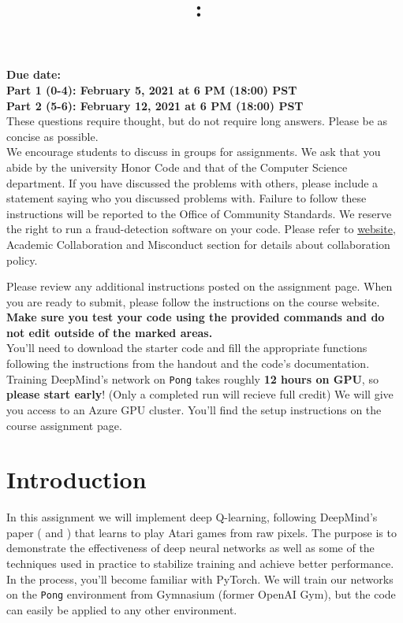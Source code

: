 \documentclass{article}
\title{
\vspace{-1in}
\textmd{\textbf{\hmwkClass:\ \hmwkTitle}}}
\author{}
\date{} %
\begin{document}
\maketitle
\vspace{-.5in}
\begin{framed}
{\bf Due date: \\
Part 1 (0-4): February 5, 2021 at 6 PM (18:00) PST\\
Part 2 (5-6): February 12, 2021 at 6 PM (18:00) PST}
\\[1em]
These questions require thought, but do not require long answers. Please be as concise as possible.
\\[1em]
We encourage students to discuss in groups for assignments. We ask
that you abide by the university Honor Code and that of the Computer Science department. If you have discussed the problems with others,
please include a statement saying who you discussed problems with. Failure to follow these instructions
will be reported to the Office of Community Standards. We reserve the right to run a fraud-detection software on your code. Please refer to \href{http://web.stanford.edu/class/cs234/index.html}{website}, Academic Collaboration and Misconduct section for details about collaboration policy.


Please review any additional instructions posted on the assignment page. When you are ready to submit, please
follow the instructions on the course website. \textbf{Make sure you test your code using the
provided commands and do not edit outside of the marked areas.}
\\[1em]
You'll need to download the starter code and fill the appropriate functions following the instructions from the handout and the code's documentation. Training DeepMind's network on \texttt{Pong} takes roughly \textbf{12 hours on GPU}, so \textbf{please start early}! (Only a completed run will recieve full credit) We will give you access to an Azure GPU cluster. You'll find the setup instructions on the course assignment page.
\end{framed}
\section*{Introduction}

In this assignment we will implement deep Q-learning, following DeepMind's paper (\cite{mnih2015human} and \cite{mnih-atari-2013}) that learns to play Atari games from raw pixels. The purpose is to demonstrate the effectiveness of deep neural networks as well as some of the techniques used in practice to stabilize training and achieve better performance. In the process, you'll become familiar with PyTorch. We will train our networks on the \texttt{Pong} environment from Gymnasium (former OpenAI Gym), but the code can easily be applied to any other environment. \\
\end{document}
